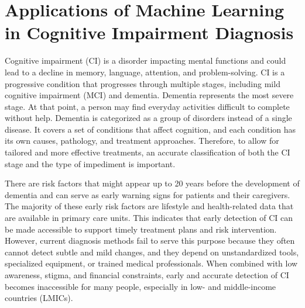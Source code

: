 \section{Applications of Machine Learning in Cognitive Impairment Diagnosis}\label{sec:ml-in-ci}
Cognitive impairment (\acrshort{CI}) is a disorder impacting mental functions and could lead to a decline in memory, language, attention, and problem-solving. CI is a progressive condition that progresses through multiple stages, including mild cognitive impairment (\acrshort{MCI}) and dementia. Dementia represents the most severe stage. At that point, a person may find everyday activities difficult to complete without help. Dementia is categorized as a group of disorders instead of a single disease. It covers a set of conditions that affect cognition, and each condition has its own causes, pathology, and treatment approaches. Therefore, to allow for tailored and more effective treatments, an accurate classification of both the CI stage and the type of impediment is important.

There are risk factors that might appear up to 20 years before the development of dementia and can serve as early warning signs for patients and their caregivers. The majority of these early risk factors are lifestyle and health-related data that are available in primary care units. This indicates that early detection of CI can be made accessible to support timely treatment plans and risk intervention. However, current diagnosis methods fail to serve this purpose because they often cannot detect subtle and mild changes, and they depend on unstandardized tools, specialized equipment, or trained medical professionals. When combined with low awareness, stigma, and financial constraints, early and accurate detection of CI becomes inaccessible for many people, especially in low- and middle-income countries (\acrshort{LMICs}).

